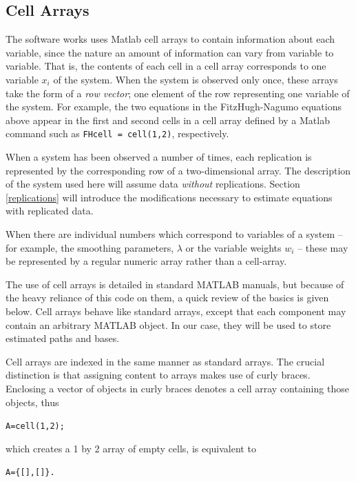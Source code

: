 \documentclass{article}
\newcommand{\nt}    {\noindent}
\begin{document}
\subsection{Cell Arrays}

The software works uses Matlab cell arrays to contain information about each variable, since the
nature an amount of information can vary from variable to variable. That is, the contents of each
cell in a cell array corresponds to one variable $x_i$ of the system. When the system is observed
only once, these arrays take the form of a {\em row vector}; one element of the row representing
one variable of the system. For example, the two equations in the FitzHugh-Nagumo equations above
appear in the first and second cells in a cell array defined by a Matlab command such as
\texttt{FHcell = cell(1,2)}, respectively.

When a system has been observed a number of times, each replication is represented by the
corresponding row of a two-dimensional array. The description of the system used here will assume
data {\em without} replications. Section \ref{replications} will introduce the modifications
necessary to estimate equations with replicated data.

When there are individual numbers which correspond to variables of a system -- for example, the
smoothing parameters, $\lambda$ or the variable weights $w_i$ -- these may be represented by a
regular numeric array rather than a cell-array.

The use of cell arrays is detailed in standard MATLAB manuals, but because of the heavy reliance of
this code on them, a quick review of the basics is given below. Cell arrays behave like standard
arrays, except that each component may contain an arbitrary MATLAB object. In our case, they will
be used to store estimated paths and bases.

Cell arrays are indexed in the same manner as standard arrays. The crucial distinction is that
assigning content to arrays makes use of curly braces. Enclosing a vector of objects in curly
braces denotes a cell array containing those objects, thus

\begin{alltt}
    A = cell(1,2);
\end{alltt}

\nt which creates a 1 by 2 array of empty cells, is equivalent
to

\begin{alltt}
    A = \{[], []\}.
\end{alltt}
\end{document}
